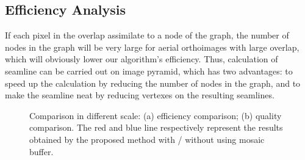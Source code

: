 \documentclass[journal]{IEEEtran}
\begin{document}
\subsection{Efficiency Analysis}
If each pixel in the overlap assimilate to a node of the graph, the number of nodes in the graph will be very large for aerial orthoimages with large overlap, which will obviously lower our algorithm's efficiency. Thus, calculation of seamline can be carried out on image pyramid, which has two advantages: to speed up the calculation by reducing the number of nodes in the graph, and to make the seamline neat by reducing vertexes on the resulting seamlines.
\begin{figure}[!t]
    \centering
    \caption{Comparison in different scale: (a) efficiency comparison; (b) quality comparison. The red and blue line respectively represent the results obtained by the proposed method with / without using mosaic buffer. }
    \label{fig:seamline-efficiency-comparison}
\end{figure}
\end{document}
